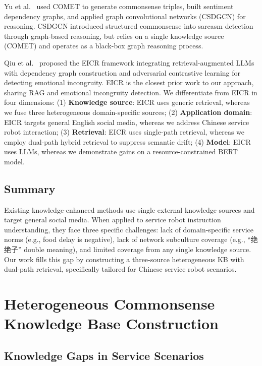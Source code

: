 \documentclass[conference]{IEEEtran}
\begin{document}
Yu et al.~\cite{csdgcn2023} used COMET to generate commonsense triples, built
sentiment dependency graphs, and applied graph convolutional networks (CSDGCN) for
reasoning. CSDGCN introduced structured commonsense into sarcasm detection through
graph-based reasoning, but relies on a single knowledge source (COMET) and
operates as a black-box graph reasoning process.

Qiu et al.~\cite{eicr2024} proposed the EICR framework integrating
retrieval-augmented LLMs with dependency graph construction and adversarial
contrastive learning for detecting emotional incongruity. EICR is the closest
prior work to our approach, sharing RAG and emotional incongruity detection.
We differentiate from EICR in four dimensions: (1) \textbf{Knowledge source}:
EICR uses generic retrieval, whereas we fuse three heterogeneous domain-specific
sources; (2) \textbf{Application domain}: EICR targets general English social media,
whereas we address Chinese service robot interaction; (3) \textbf{Retrieval}:
EICR uses single-path retrieval, whereas we employ dual-path hybrid retrieval to
suppress semantic drift; (4) \textbf{Model}: EICR uses LLMs, whereas we demonstrate
gains on a resource-constrained BERT model.

\subsection{Summary}

Existing knowledge-enhanced methods use single external knowledge sources and
target general social media. When applied to service robot instruction understanding,
they face three specific challenges: lack of domain-specific service norms
(e.g., food delay is negative), lack of network subculture coverage (e.g., ``绝绝子''
double meaning), and limited coverage from any single knowledge source.
Our work fills this gap by constructing a three-source heterogeneous KB with
dual-path retrieval, specifically tailored for Chinese service robot scenarios.

\section{Heterogeneous Commonsense Knowledge Base Construction}

\subsection{Knowledge Gaps in Service Scenarios}
\end{document}

